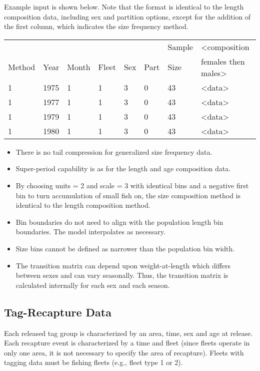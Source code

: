 Example input is shown below. Note that the format is identical to the length composition data, including sex and partition options, except for the addition of the first column, which indicates the size frequency method.

\begin{center}
	\begin{tabular}{p{1.5cm} p{1cm} p{1cm} p{1cm} p{1cm} p{1cm} p{1.5cm} p{5cm}}
		\hline
		& & & & & & Sample & <composition \Tstrut\\
		Method & Year & Month & Fleet & Sex & Part & Size & females then males>\Bstrut\\
		\hline
		1 & 1975 & 1 & 1 & 3 & 0 & 43 & <data> \Tstrut\\
		1 & 1977 & 1 & 1 & 3 & 0 & 43 & <data> \\
		1 & 1979 & 1 & 1 & 3 & 0 & 43 & <data> \\
		1 & 1980 & 1 & 1 & 3 & 0 & 43 & <data> \Bstrut\\
		\hline
	\end{tabular}
\end{center}

	\begin{itemize}
		\item There is no tail compression for generalized size frequency data.
		\item Super-period capability is as for the length and age composition data.
		\item By choosing units = 2 and scale = 3 with identical bins and a negative first bin to turn accumulation of small fish on, the size composition method is identical to the length composition method.
		\item Bin boundaries do not need to align with the population length bin boundaries. The model interpolates as necessary.
		\item Size bins cannot be defined as narrower than the population bin width.
		\item The transition matrix can depend upon weight-at-length which differs between sexes and can vary seasonally. Thus, the transition matrix is calculated internally for each sex and each season.
	\end{itemize}

\subsection{Tag-Recapture Data}
Each released tag group is characterized by an area, time, sex and age at release. Each recapture event is characterized by a time and fleet (since fleets operate in only one area, it is not necessary to specify the area of recapture). Fleets with tagging data must be fishing fleets (e.g., fleet type 1 or 2). 

